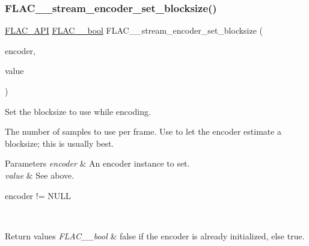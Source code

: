 \subsubsection{\texorpdfstring{F\+L\+A\+C\+\_\+\+\_\+stream\+\_\+encoder\+\_\+set\+\_\+blocksize()}{FLAC\_\_stream\_encoder\_set\_blocksize()}}
{\footnotesize\ttfamily \hyperlink{group__flac__export_ga56ca07df8a23310707732b1c0007d6f5}{F\+L\+A\+C\+\_\+\+A\+PI} \hyperlink{ordinals_8h_a95103469f1cbd78b8cf250194985b34e}{F\+L\+A\+C\+\_\+\+\_\+bool} F\+L\+A\+C\+\_\+\+\_\+stream\+\_\+encoder\+\_\+set\+\_\+blocksize (\begin{DoxyParamCaption}\item[{\hyperlink{struct_f_l_a_c_____stream_encoder}{F\+L\+A\+C\+\_\+\+\_\+\+Stream\+Encoder} $\ast$}]{encoder,  }\item[{unsigned}]{value }\end{DoxyParamCaption})}

Set the blocksize to use while encoding.

The number of samples to use per frame. Use {} to let the encoder estimate a blocksize; this is usually best.

{} 
\begin{DoxyParams}{Parameters}
{\em encoder} & An encoder instance to set. \\
\hline
{\em value} & See above.  
\begin{DoxyCode}
encoder != NULL 
\end{DoxyCode}
 \\
\hline
\end{DoxyParams}

\begin{DoxyRetVals}{Return values}
{\em F\+L\+A\+C\+\_\+\+\_\+bool} & {\ttfamily false} if the encoder is already initialized, else {\ttfamily true}. \\
\hline
\end{DoxyRetVals}
\mbox{\label{group__flac__stream__encoder_gabfc9c883c124a849b5b42a87c30e10a5}} 
